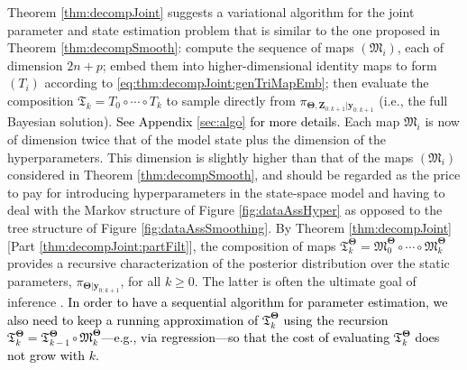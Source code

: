 \documentclass[twoside,11pt]{article}
\newcommand{\yb}{\boldsymbol{y}}
\newcommand{\Zb}{\boldsymbol{Z}}
\newcommand{\vhyp}{\boldsymbol{\Theta}}
\newcommand{\submap}{\mathfrak{M}}
\newcommand{\hrevone}{\textcolor{black} }
\begin{document}
%
%
%
%
%
%
%
%
%
%
%
%
%
%
%
%
%
%
%
%
%
%
%
%
%
%
%
%
%
%
%
%
%
%
%
%
%
%
%
%
%

%
%
%
%
%
%
%
%
%
%
%
%
%
%
%
%
%
%
%
%
%
%
%
%
%
%
%
%
%
%
%
%
%
%
%
%
%
%
%
%
%
%
%
%
%
%
%
%
%
%
%
%
%
%
%
%
%
%
%
%
%
%
%
%
%
%
%
%
%
%
%
%
%
%
%
%
%
%
%
%
%
%

Theorem \ref{thm:decompJoint} suggests a variational %
algorithm
for the joint parameter and state estimation problem that is
similar to the one proposed in Theorem \ref{thm:decompSmooth}: 
compute the sequence of maps $(\submap_i)$, each of dimension $2n+p$;
embed them into
higher-dimensional identity maps to form $(T_i)$ according to
\eqref{eq:thm:decompJoint:genTriMapEmb};
then evaluate the composition
$\mathfrak{T}_k = T_0 \circ \cdots \circ T_k$ to sample directly from
$\pi_{\vhyp,\Zb_{0:k+1} \vert \yb_{0:k+1} }$ (i.e., the full Bayesian
solution). %
%
\hrevone{ 
See Appendix \ref{sec:algo} for more details.
}
Each map $\submap_i$ is now of dimension twice that of the
model state plus the dimension of the hyperparameters. This dimension is
slightly higher than that of the maps $(\submap_i)$ considered
in Theorem \ref{thm:decompSmooth},
and should be regarded as the price to pay
for introducing hyperparameters in the state-space
model and having to deal with the Markov structure of Figure \ref{fig:dataAssHyper}
as opposed to the tree structure of Figure \ref{fig:dataAssSmoothing}.
By Theorem \ref{thm:decompJoint}[Part \ref{thm:decompJoint:partFilt}], the composition 
of maps 
$\mathfrak{T}^{\vhyp}_{k} = \submap_{0}^{\vhyp} \circ \cdots \circ \submap_{k}^{\vhyp}$
provides a recursive  characterization of the posterior distribution over the static 
parameters, $\pi_{ \vhyp \vert \yb_{0:k+1}}$, for all $k \ge 0$.
The latter is often the ultimate goal of inference \citep{andrieu2010particle}.
\textcolor{black}{ 
In order to have a sequential algorithm for
parameter estimation, we also need to keep
a running approximation of 
$\mathfrak{T}^{\vhyp}_{k}$ 
using the recursion $\mathfrak{T}^{\vhyp}_{k} = \mathfrak{T}^{\vhyp}_{k-1} \circ 
\submap_{k}^{\vhyp}$---e.g., via regression---so that the
cost of evaluating $\mathfrak{T}^{\vhyp}_{k}$ does not grow with $k$.
}
\end{document}
